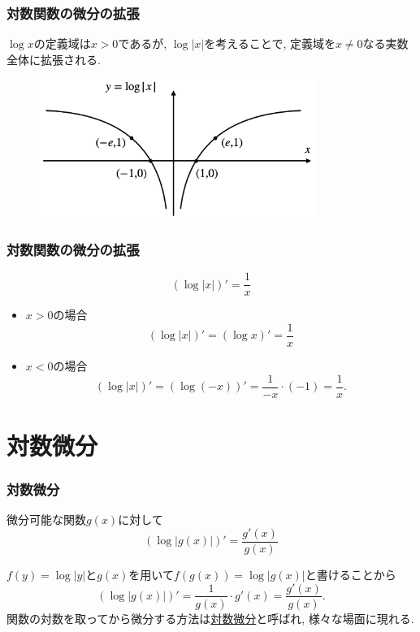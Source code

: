 \begin{frame}
\frametitle{対数関数の微分の拡張}

$\log x$の定義域は$x>0$であるが, $\log |x|$を考えることで, 定義域を$x\neq 0$なる実数全体に拡張される. 

 \begin{figure}[htbp]
 \begin{center} 
  \includegraphics[width=90mm]{calculus5/log_abs.png}
 \end{center}
\end{figure}


\end{frame}




\begin{frame}
\frametitle{対数関数の微分の拡張}


\begin{Thm} 
$$(\log |x|)'=\frac{1}{x}$$
\end{Thm}

\begin{itemize}
\item $x>0$の場合
$$
(\log |x|)' = (\log x)'=\frac{1}{x}
$$
\item $x<0$の場合
$$
(\log |x|)' = (\log (-x))'=\frac{1}{-x} \cdot (-1)=\frac{1}{x}. 
$$
\end{itemize}


\end{frame}




\section{対数微分}

\begin{frame}
\frametitle{対数微分}



\begin{Thm} \label{対数微分}
微分可能な関数$g(x)$に対して
$$(\log |g(x)|)'=\frac{g'(x)}{g(x)}$$
\end{Thm}

$f(y)=\log |y|$と$g(x)$を用いて$f(g(x))=\log|g(x)|$と書けることから
$$
(\log |g(x)|)'=\frac{1}{g(x)}\cdot g'(x)=\frac{g'(x)}{g(x)}. 
$$
関数の対数を取ってから微分する方法は\underline{対数微分}と呼ばれ, 様々な場面に現れる. 

\end{frame}


